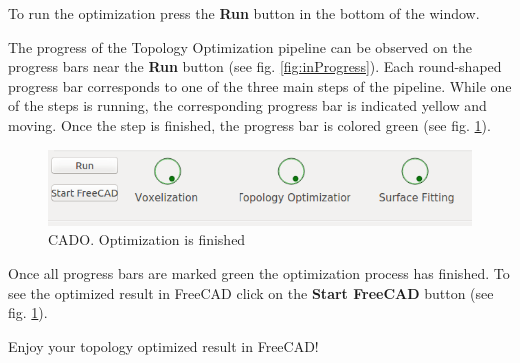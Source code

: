 \documentclass[
12pt, %
a4paper, %
oneside, %
headinclude,footinclude, %
BCOR5mm, %
]{scrartcl}
\begin{document}
To run the optimization press the \textbf{Run} button in the bottom of the window.

The progress of the Topology Optimization pipeline can be observed on the progress bars near the \textbf{Run} button (see fig. \ref{fig:inProgress}). Each round-shaped progress bar corresponds to one of the three main steps of the pipeline. While one of the steps is running, the corresponding progress bar is indicated yellow and moving. Once the step is finished, the progress bar is colored green (see fig. \ref{fig:progressBarsFinished}).

\begin{figure}
\centering
\includegraphics[scale=0.4]{Pictures/progressBar_ready.png}
\caption{CADO. Optimization is finished}
\label{fig:progressBarsFinished}
\end{figure}

Once all progress bars are marked green the optimization process has finished. To see the optimized result in FreeCAD click on the \textbf{Start FreeCAD} button (see fig. \ref{fig:progressBarsFinished}).

\vspace{1cm}
Enjoy your topology optimized result in FreeCAD!
\end{document}
